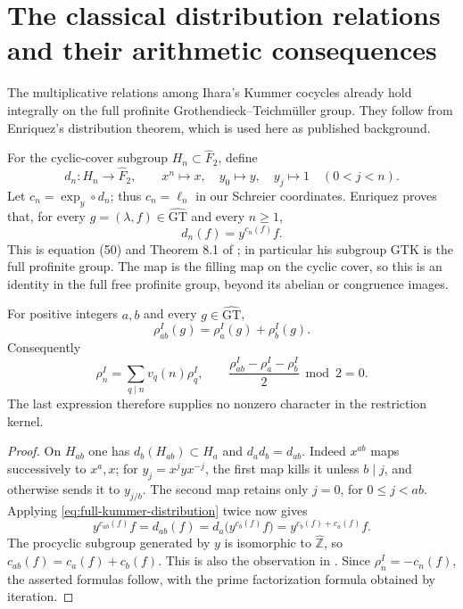 \section{The classical distribution relations and their arithmetic consequences}
\label{sec:kummer-distribution}

The multiplicative relations among Ihara's Kummer cocycles already hold
integrally on the full profinite Grothendieck--Teichm\"uller group.
They follow from Enriquez's distribution theorem, which is used here as
published background.

For the cyclic-cover subgroup $H_n\subset\widehat F_2$, define
\[
 d_n:H_n\longrightarrow\widehat F_2,\qquad
 x^n\longmapsto x,\quad y_0\longmapsto y,\quad
 y_j\longmapsto1\quad(0<j<n).
\]
Let $c_n=\operatorname{exp}_y\circ d_n$; thus $c_n=\ell_n$ in
our Schreier coordinates. Enriquez proves that, for every
$g=(\lambda,f)\in\widehat{\mathrm{GT}}$ and every $n\geq1$,
\begin{equation}
 d_n(f)=y^{c_n(f)}f.
 \label{eq:full-kummer-distribution}
\end{equation}
This is equation (50) and Theorem 8.1 of \cite{Enriquez2007}; in
particular his subgroup $\mathrm{GTK}$ is the full profinite group.
The map is the filling map on the cyclic cover, so this is an identity
in the full free profinite group, beyond its abelian or congruence images.

\begin{proposition}\label{prop:kummer-multiplicativity}
For positive integers $a,b$ and every $g\in\widehat{\mathrm{GT}}$,
\[
 \rho_{ab}^I(g)=\rho_a^I(g)+\rho_b^I(g).
\]
Consequently
\[
 \rho_n^I=\sum_{q\mid n}v_q(n)\rho_q^I,
 \qquad
 \frac{\rho_{ab}^I-\rho_a^I-\rho_b^I}{2}\bmod2=0.
\]
The last expression therefore supplies no nonzero character in the
restriction kernel.
\end{proposition}
\begin{proof}
On $H_{ab}$ one has $d_b(H_{ab})\subset H_a$ and
$d_a d_b=d_{ab}$. Indeed $x^{ab}$ maps successively to $x^a,x$;
for $y_j=x^jyx^{-j}$, the first map kills it unless $b\mid j$,
and otherwise sends it to $y_{j/b}$. The second map retains only
$j=0$, for $0\leq j<ab$.
Applying \eqref{eq:full-kummer-distribution} twice now gives
\[
 y^{c_{ab}(f)}f=d_{ab}(f)
   =d_a\bigl(y^{c_b(f)}f\bigr)
   =y^{c_b(f)+c_a(f)}f.
\]
The procyclic subgroup generated by $y$ is isomorphic to
$\widehat{\mathbb Z}$, so $c_{ab}(f)=c_a(f)+c_b(f)$.
This is also the observation in \cite[Remark 8.6]{Enriquez2007}.
Since $\rho_n^I=-c_n(f)$, the asserted formulas follow, with the
prime factorization formula obtained by iteration.
\end{proof}


